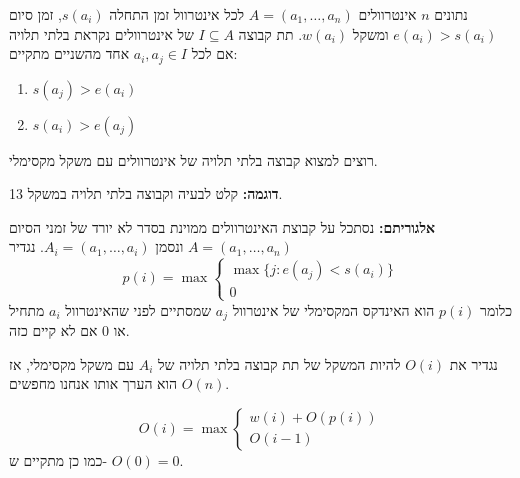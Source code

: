 נתונים $n$ אינטרוולים
$A = (a_1,\ldots,a_n)$
לכל אינטרוול זמן התחלה 
$s(a_i)$,
זמן סיום
$e(a_i) > s(a_i)$
ומשקל
$w(a_i)$.
תת קבוצה 
$I \subseteq A$
של אינטרוולים  נקראת בלתי תלויה אם לכל 
$a_i, a_j \in I$
אחד מהשניים מתקיים:
\begin{enumerate}
\item
$s(a_j) > e(a_i)$
\item
$s(a_i) > e(a_j)$
\end{enumerate}

רוצים למצוא קבוצה בלתי תלויה של אינטרוולים עם משקל מקסימלי.

\textbf{דוגמה:}
קלט לבעיה וקבוצה בלתי תלויה במשקל 13.
\begin{center}
\end{center}


\textbf{אלגוריתם:}
נסתכל על קבוצת האינטרוולים ממוינת בסדר לא יורד של זמני הסיום
$A = (a_1,\ldots,a_n)$
ונסמן 
$A_i = (a_1,\ldots,a_i)$.
נגדיר
$$p(i) = \max
\begin{cases}
\max \{j : e(a_j) < s(a_i)\}
\\
0
\end{cases}
$$
כלומר 
$p(i)$
הוא האינדקס המקסימלי של אינטרוול
$a_j$
שמסתיים לפני שהאינטרוול 
$a_i$
מתחיל או 0 אם לא קיים כזה.

נגדיר את 
$O(i)$
להיות המשקל של תת קבוצה בלתי תלויה של 
$A_i$
עם משקל מקסימלי, אז
$O(n)$
הוא הערך אותו אנחנו מחפשים.

\begin{claim}
$$
O(i) = \max
\begin{cases}
w(i) + O(p(i))
\\
O(i - 1)
\end{cases}
$$
כמו כן מתקיים ש-%
$O(0) = 0$.
\end{claim}

